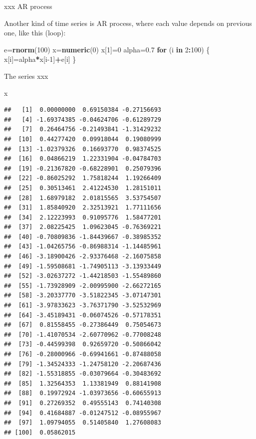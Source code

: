 \documentclass[ignorenonframetext,]{beamer}
\newenvironment{Shaded}{\begin{snugshade}}{\end{snugshade}}
\newcommand{\ControlFlowTok}[1]{\textcolor[rgb]{0.13,0.29,0.53}{\textbf{#1}}}
\newcommand{\DecValTok}[1]{\textcolor[rgb]{0.00,0.00,0.81}{#1}}
\newcommand{\FloatTok}[1]{\textcolor[rgb]{0.00,0.00,0.81}{#1}}
\newcommand{\KeywordTok}[1]{\textcolor[rgb]{0.13,0.29,0.53}{\textbf{#1}}}
\newcommand{\NormalTok}[1]{#1}
\newcommand{\OperatorTok}[1]{\textcolor[rgb]{0.81,0.36,0.00}{\textbf{#1}}}
\begin{document}
\begin{frame}[fragile]{xxx AR process}
\protect\hypertarget{xxx-ar-process}{}

Another kind of time series is AR process, where each value depends on
previous one, like this (loop):

\begin{Shaded}
\begin{Highlighting}[]
\NormalTok{e=}\KeywordTok{rnorm}\NormalTok{(}\DecValTok{100}\NormalTok{)}
\NormalTok{x=}\KeywordTok{numeric}\NormalTok{(}\DecValTok{0}\NormalTok{)}
\NormalTok{x[}\DecValTok{1}\NormalTok{]=}\DecValTok{0}
\NormalTok{alpha=}\FloatTok{0.7}
\ControlFlowTok{for}\NormalTok{ (i }\ControlFlowTok{in} \DecValTok{2}\OperatorTok{:}\DecValTok{100}\NormalTok{)}
\NormalTok{\{}
\NormalTok{  x[i]=alpha}\OperatorTok{*}\NormalTok{x[i}\DecValTok{-1}\NormalTok{]}\OperatorTok{+}\NormalTok{e[i]}
\NormalTok{\}}
\end{Highlighting}
\end{Shaded}

\end{frame}

\begin{frame}[fragile]{The series xxx}
\protect\hypertarget{the-series-xxx-1}{}

\begin{Shaded}
\begin{Highlighting}[]
\NormalTok{x}
\end{Highlighting}
\end{Shaded}

\begin{verbatim}
##   [1]  0.00000000  0.69150384 -0.27156693
##   [4] -1.69374385 -0.04624706 -0.61289729
##   [7]  0.26464756 -0.21493841 -1.31429232
##  [10]  0.44277420  0.09918044  0.19080999
##  [13] -1.02379326  0.16693770  0.98374525
##  [16]  0.04866219  1.22331904 -0.04784703
##  [19] -0.21367820 -0.68228901  0.25079396
##  [22] -0.86025292  1.75818244  1.19266409
##  [25]  0.30513461  2.41224530  1.28151011
##  [28]  1.68979182  2.01815565  3.53754507
##  [31]  1.85840920  2.32513921  1.77111656
##  [34]  2.12223993  0.91095776  1.58477201
##  [37]  2.08225425  1.09623045 -0.76369221
##  [40] -0.70809836 -1.84439667 -0.38985352
##  [43] -1.04265756 -0.86988314 -1.14485961
##  [46] -3.18900426 -2.93376468 -2.16075858
##  [49] -1.59508681 -1.74905113 -3.13933449
##  [52] -3.02637272 -1.44218503 -1.55489860
##  [55] -1.73928909 -2.00995900 -2.66272165
##  [58] -3.20337770 -3.51822345 -3.07147301
##  [61] -3.97833623 -3.76371790 -3.52532969
##  [64] -3.45189431 -0.06074526 -0.57178351
##  [67]  0.81558455 -0.27386449  0.75054673
##  [70] -1.41070534 -2.60770962 -0.77008248
##  [73] -0.44599398  0.92659720 -0.50866042
##  [76] -0.28000966 -0.69941661 -0.87488058
##  [79] -1.34524333 -1.24758120 -2.20687436
##  [82] -1.55318855 -0.03079664 -0.30483692
##  [85]  1.32564353  1.13381949  0.88141908
##  [88]  0.19972924 -1.03973656 -0.60655913
##  [91]  0.27269352  0.49555143  0.74140308
##  [94]  0.41684887 -0.01247512 -0.08955967
##  [97]  1.09794055  0.51405840  1.27608083
## [100]  0.05862015
\end{verbatim}

\end{frame}
\end{document}
